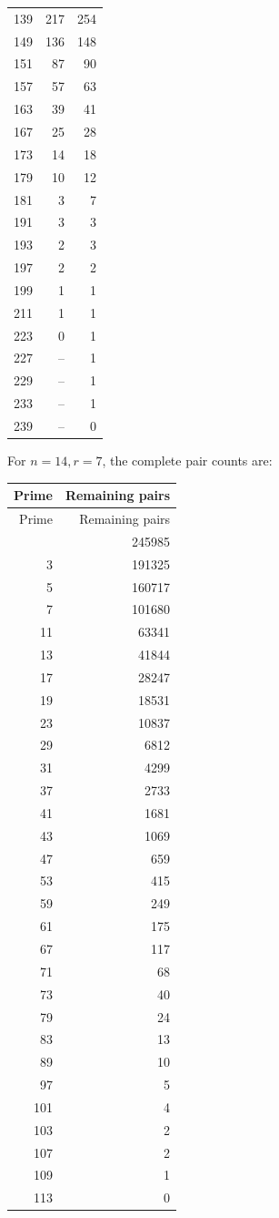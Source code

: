 \documentclass[11pt,reqno,letterpaper]{amsart}
\theoremstyle{definition}
\numberwithin{equation}{section}
\begin{document}
\begin{longtable}{rrr}
139&217&254\\
149&136&148\\
151&87&90\\
157&57&63\\
163&39&41\\
167&25&28\\
173&14&18\\
179&10&12\\
181&3&7\\
191&3&3\\
193&2&3\\
197&2&2\\
199&1&1\\
211&1&1\\
223&0&1\\
227&--&1\\
229&--&1\\
233&--&1\\
239&--&0\\
\end{longtable}

For $n=14,r=7$, the complete pair counts are:
\begin{longtable}{rr}
\toprule Prime&Remaining pairs\\\midrule
\endfirsthead
\toprule Prime&Remaining pairs\\\midrule\endhead
\bottomrule\endfoot
2&245985\\
3&191325\\
5&160717\\
7&101680\\
11&63341\\
13&41844\\
17&28247\\
19&18531\\
23&10837\\
29&6812\\
31&4299\\
37&2733\\
41&1681\\
43&1069\\
47&659\\
53&415\\
59&249\\
61&175\\
67&117\\
71&68\\
73&40\\
79&24\\
83&13\\
89&10\\
97&5\\
101&4\\
103&2\\
107&2\\
109&1\\
113&0\\
\end{longtable}
\end{document}
